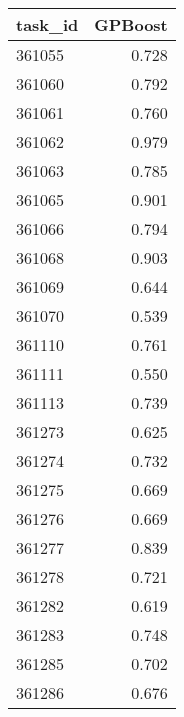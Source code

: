 \begin{tabular}{lr}
\toprule
task\_id & GPBoost \\
\midrule
361055 & 0.728 \\
361060 & 0.792 \\
361061 & 0.760 \\
361062 & 0.979 \\
361063 & 0.785 \\
361065 & 0.901 \\
361066 & 0.794 \\
361068 & 0.903 \\
361069 & 0.644 \\
361070 & 0.539 \\
361110 & 0.761 \\
361111 & 0.550 \\
361113 & 0.739 \\
361273 & 0.625 \\
361274 & 0.732 \\
361275 & 0.669 \\
361276 & 0.669 \\
361277 & 0.839 \\
361278 & 0.721 \\
361282 & 0.619 \\
361283 & 0.748 \\
361285 & 0.702 \\
361286 & 0.676 \\
\bottomrule
\end{tabular}
